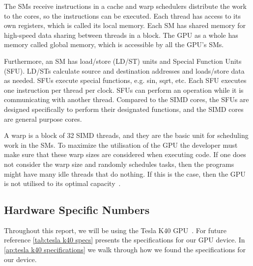 The SMs receive instructions in a cache and warp schedulers distribute the work to the cores, so the instructions can be executed.
Each thread has access to its own registers, which is called its local memory.
Each SM has shared memory for high-speed data sharing between threads in a block.
The GPU as a whole has memory called global memory, which is accessible by all the GPU's SMs.

Furthermore, an SM has load/store (LD/ST) units and Special Function Units (SFU).
LD/STs calculate source and destination addresses and loads/store data as needed.
SFUs execute special functions, e.g. sin, sqrt, etc.
Each SFU executes one instruction per thread per clock.
SFUs can perform an operation while it is communicating with another thread.
Compared to the SIMD cores, the SFUs are designed specifically to perform their designated functions, and the SIMD cores are general purpose cores.

A warp is a block of 32 SIMD threads, and they are the basic unit for scheduling work in the SMs.
To maximize the utilisation of the GPU the developer must make sure that these warp sizes are considered when executing code.
If one does not consider the warp size and randomly schedules tasks, then the programs might have many idle threads that do nothing.
If this is the case, then the GPU is not utilised to its optimal capacity~\cite{fermi2009nvidia}.

\subsection{Hardware Specific Numbers}
\label{sec:hardware specific numbers}

Throughout this report, we will be using the Tesla K40 GPU~\cite{teslak402013nvidia}.
For future reference \cref{tab:tesla k40 specs} presents the specifications for our GPU device.
In \cref{ap:tesla k40 specifications} we walk through how we found the specifications for our device.

